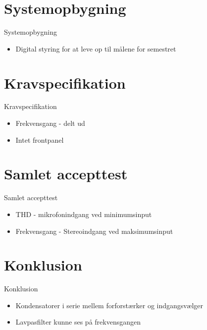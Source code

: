 \documentclass{beamer}
\begin{document}

\section{Systemopbygning}
\begin{frame}{Systemopbygning}
\begin{itemize}
\item Digital styring for at leve op til målene for semestret
\end{itemize}
\end{frame}


\section{Kravspecifikation}
\begin{frame}{Kravspecifikation}
\begin{itemize}
\item Frekvensgang - delt ud
\item Intet frontpanel
\end{itemize}
\end{frame}


\section{Samlet accepttest}
\begin{frame}{Samlet accepttest}
\begin{itemize}
\item THD - mikrofonindgang ved minimumsinput
\item Frekvensgang - Stereoindgang ved maksimumsinput
\end{itemize}
\end{frame}



\section{Konklusion}
\begin{frame}{Konklusion}
\begin{itemize}
\item Kondensatorer i serie mellem forforstærker og indgangsvælger
\item Lavpasfilter kunne ses på frekvensgangen
\end{itemize}
\end{frame}
\end{document}

